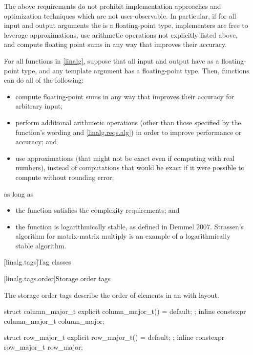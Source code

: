 \begin{note}
The above requirements do not prohibit
implementation approaches and optimization techniques
which are not user-observable.
In particular, if for all input and output arguments
the  is a floating-point type,
implementers are free to leverage approximations,
use arithmetic operations not explicitly listed above, and
compute floating point sums in any way that improves their accuracy.
\end{note}

\pnum
\begin{note}
For all functions in \ref{linalg},
suppose that all input and output  have as 
a floating-point type, and
any  template argument has a floating-point type.
Then, functions can do all of the following:
\begin{itemize}
\item
compute floating-point sums in any way
that improves their accuracy for arbitrary input;
\item
perform additional arithmetic operations
(other than those specified by the function's wording and \ref{linalg.reqs.alg})
in order to improve performance or accuracy; and
\item
use approximations
(that might not be exact even if computing with real numbers),
instead of computations that would be exact
if it were possible to compute without rounding error;
\end{itemize}
as long as
\begin{itemize}
\item
the function satisfies the complexity requirements; and
\item
the function is logarithmically stable,
as defined in Demmel 2007.
Strassen's algorithm for matrix-matrix multiply
is an example of a logarithmically stable algorithm.
\end{itemize}
\end{note}

[linalg.tags]{Tag classes}

[linalg.tags.order]{Storage order tags}

\pnum
The storage order tags describe
the order of elements in an  with
 layout.
\begin{itemdecl}
struct column_major_t {
  explicit column_major_t() = default;
};
inline constexpr column_major_t column_major{};

struct row_major_t {
  explicit row_major_t() = default;
};
inline constexpr row_major_t row_major{};
\end{itemdecl}

